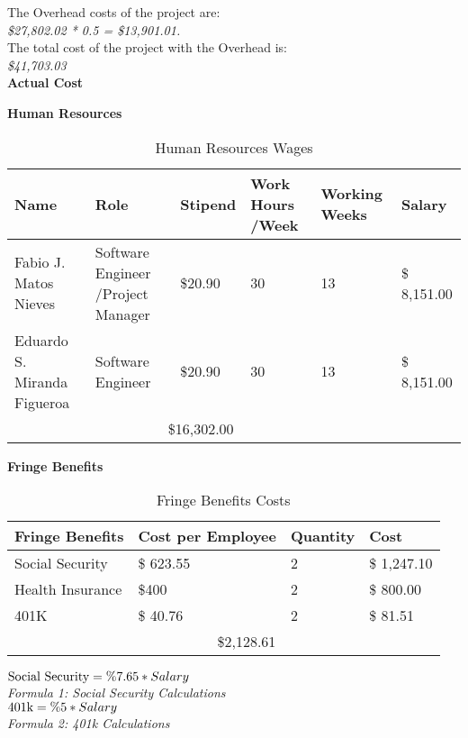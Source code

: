The Overhead costs of the project are:\\
\textit{\$27,802.02 * 0.5 = \$13,901.01.}\\
The total cost of the project with the Overhead is:\\
\textit{\$41,703.03}\\
\textbf{Actual Cost}
\begin{table}[h]
   \centering
   \textbf{Human Resources}
   \begin{tabular}{||m{}|m{}|m{}|m{}|m{}|m{}||}
    \hline 
    \rowcolor{cyan!50}
    Name & Role & Stipend & Work Hours /Week & Working Weeks & Salary\\
    \hline
    Fabio J. Matos Nieves & Software Engineer /Project Manager& \$20.90 & 30 & 13 & \$ 8,151.00\\ 
    \hline
    Eduardo S. Miranda Figueroa & Software Engineer & \$20.90 & 30 & 13 & \$ 8,151.00\\
   
    \hline 
    \rowcolor{teal!50}
    \multicolumn{3}{||c|}{Total Cost} & \multicolumn{3}{c||}{\$16,302.00}\\
    \hline
   \end{tabular}
   \caption {Human Resources Wages}
   \label{table:7}
\end{table}
\begin{table}[h]
   \centering
   \textbf{Fringe Benefits\cite{WhatAreFringe}}
   \begin{tabular}{||m{}|m{}|m{}|m{}||}
       \hline 
       \rowcolor{cyan!50}
       Fringe Benefits & Cost per Employee & Quantity & Cost\\
       \hline
       Social Security &  \$ 623.55 & 2 & \$ 1,247.10\\ 
       \hline
       Health Insurance & \$400 & 2 & \$ 800.00 \\
       \hline
       401K & \$ 40.76 & 2 & \$ 81.51\\ 
       \hline 
       \rowcolor{teal!50}
       \multicolumn{2}{||c|}{Total Cost} & \multicolumn{2}{c||}{\$2,128.61}\\
       \hline
      \end{tabular}
      \caption {Fringe Benefits Costs}
      \label{table:8}
      $\textnormal{Social Security} = \%7.65 * Salary$\\
     \textit{Formula 1: Social Security Calculations}\\
       $\textnormal{401k} = \%5 * Salary$\\
       \textit{Formula 2: 401k Calculations}
      
\end{table}
